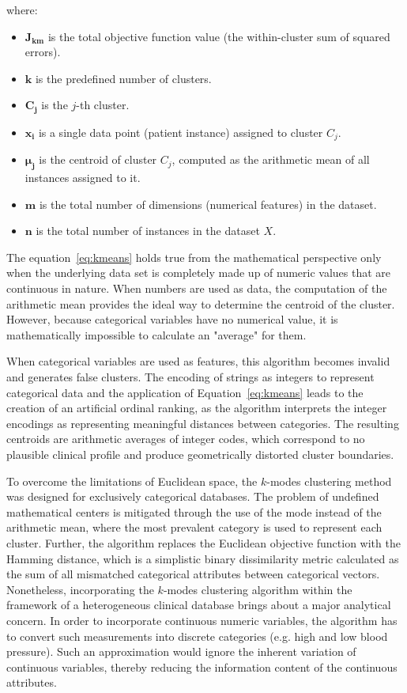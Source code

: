 where:
\begin{itemize}
    \item $\boldsymbol{J_{km}}$ is the total objective function value (the within-cluster sum of squared errors).
    \item $\boldsymbol{k}$ is the predefined number of clusters.
    \item $\boldsymbol{C_j}$ is the $j$-th cluster.
    \item $\boldsymbol{x_i}$ is a single data point (patient instance) assigned to cluster $C_j$.
    \item $\boldsymbol{\mu_j}$ is the centroid of cluster $C_j$, computed as the arithmetic mean of all instances assigned to it.
    \item $\boldsymbol{m}$ is the total number of dimensions (numerical features) in the dataset.
    \item $\boldsymbol{n}$ is the total number of instances in the dataset $X$.
\end{itemize}

\vspace{1em}

The equation~\eqref{eq:kmeans} holds true from the mathematical perspective only when the underlying data set is completely made up of numeric values that are continuous in nature. When numbers are used as data, the computation of the arithmetic mean provides the ideal way to determine the centroid of the cluster. However, because categorical variables have no numerical value, it is mathematically impossible to calculate an "average" for them.

When categorical variables are used as features, this algorithm becomes invalid and generates false clusters. The encoding of strings as integers to represent categorical data and the application of Equation~\eqref{eq:kmeans} leads to the creation of an artificial ordinal ranking, as the algorithm interprets the integer encodings as representing meaningful distances between categories. The resulting centroids are arithmetic averages of integer codes, which correspond to no plausible clinical profile and produce geometrically distorted cluster boundaries.

To overcome the limitations of Euclidean space, the $k$-modes clustering method was designed for exclusively categorical databases. The problem of undefined mathematical centers is mitigated through the use of the mode instead of the arithmetic mean, where the most prevalent category is used to represent each cluster. Further, the algorithm replaces the Euclidean objective function with the Hamming distance, which is a simplistic binary dissimilarity metric calculated as the sum of all mismatched categorical attributes between categorical vectors. Nonetheless, incorporating the $k$-modes clustering algorithm within the framework of a heterogeneous clinical database brings about a major analytical concern. In order to incorporate continuous numeric variables, the algorithm has to convert such measurements into discrete categories (e.g. high and low blood pressure). Such an approximation would ignore the inherent variation of continuous variables, thereby reducing the information content of the continuous attributes.

